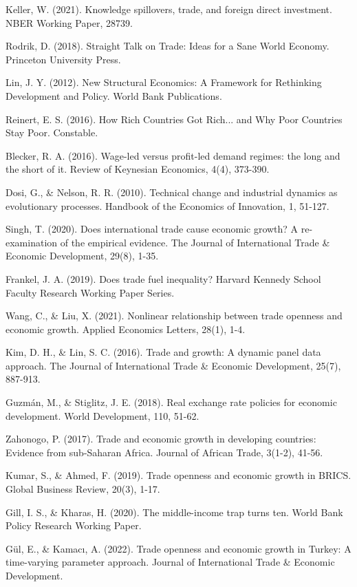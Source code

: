 \documentclass[12pt,a4paper]{article}
\theoremstyle{definition}
\begin{document}
\begin{thebibliography}{99}
 Keller, W. (2021). Knowledge spillovers, trade, and foreign direct investment. NBER Working Paper, 28739.

 Rodrik, D. (2018). Straight Talk on Trade: Ideas for a Sane World Economy. Princeton University Press.

 Lin, J. Y. (2012). New Structural Economics: A Framework for Rethinking Development and Policy. World Bank Publications.

 Reinert, E. S. (2016). How Rich Countries Got Rich... and Why Poor Countries Stay Poor. Constable.

 Blecker, R. A. (2016). Wage-led versus profit-led demand regimes: the long and the short of it. Review of Keynesian Economics, 4(4), 373-390.

 Dosi, G., \& Nelson, R. R. (2010). Technical change and industrial dynamics as evolutionary processes. Handbook of the Economics of Innovation, 1, 51-127.

 Singh, T. (2020). Does international trade cause economic growth? A re-examination of the empirical evidence. The Journal of International Trade \& Economic Development, 29(8), 1-35.

 Frankel, J. A. (2019). Does trade fuel inequality? Harvard Kennedy School Faculty Research Working Paper Series.

 Wang, C., \& Liu, X. (2021). Nonlinear relationship between trade openness and economic growth. Applied Economics Letters, 28(1), 1-4.

 Kim, D. H., \& Lin, S. C. (2016). Trade and growth: A dynamic panel data approach. The Journal of International Trade \& Economic Development, 25(7), 887-913.

 Guzmán, M., \& Stiglitz, J. E. (2018). Real exchange rate policies for economic development. World Development, 110, 51-62.

 Zahonogo, P. (2017). Trade and economic growth in developing countries: Evidence from sub-Saharan Africa. Journal of African Trade, 3(1-2), 41-56.

 Kumar, S., \& Ahmed, F. (2019). Trade openness and economic growth in BRICS. Global Business Review, 20(3), 1-17.

 Gill, I. S., \& Kharas, H. (2020). The middle-income trap turns ten. World Bank Policy Research Working Paper.

 Gül, E., \& Kamacı, A. (2022). Trade openness and economic growth in Turkey: A time-varying parameter approach. Journal of International Trade \& Economic Development.

\end{thebibliography}
\end{document}
